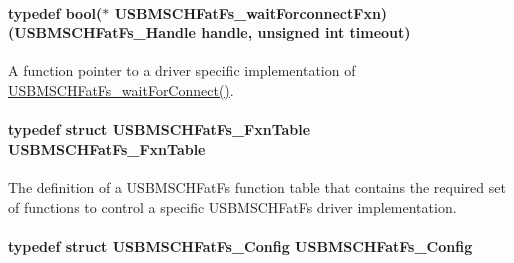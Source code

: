 \paragraph[{U\+S\+B\+M\+S\+C\+H\+Fat\+Fs\+\_\+wait\+Forconnect\+Fxn}]{\setlength{\rightskip}{0pt plus 5cm}typedef bool($\ast$ U\+S\+B\+M\+S\+C\+H\+Fat\+Fs\+\_\+wait\+Forconnect\+Fxn) ({\bf U\+S\+B\+M\+S\+C\+H\+Fat\+Fs\+\_\+\+Handle} handle, unsigned int timeout)}\label{_u_s_b_m_s_c_h_fat_fs_8h_a0c9baca220e5c94c5b5e27cb8963e6f8}


A function pointer to a driver specific implementation of \hyperlink{_u_s_b_m_s_c_h_fat_fs_8h_afc7ee4e1bbb95a37943335833a27f94c}{U\+S\+B\+M\+S\+C\+H\+Fat\+Fs\+\_\+wait\+For\+Connect()}. 

\paragraph[{U\+S\+B\+M\+S\+C\+H\+Fat\+Fs\+\_\+\+Fxn\+Table}]{\setlength{\rightskip}{0pt plus 5cm}typedef struct {\bf U\+S\+B\+M\+S\+C\+H\+Fat\+Fs\+\_\+\+Fxn\+Table}  {\bf U\+S\+B\+M\+S\+C\+H\+Fat\+Fs\+\_\+\+Fxn\+Table}}\label{_u_s_b_m_s_c_h_fat_fs_8h_a1d6f17f051fce0337c51c8c56d9b4675}


The definition of a U\+S\+B\+M\+S\+C\+H\+Fat\+Fs function table that contains the required set of functions to control a specific U\+S\+B\+M\+S\+C\+H\+Fat\+Fs driver implementation. 

\paragraph[{U\+S\+B\+M\+S\+C\+H\+Fat\+Fs\+\_\+\+Config}]{\setlength{\rightskip}{0pt plus 5cm}typedef struct {\bf U\+S\+B\+M\+S\+C\+H\+Fat\+Fs\+\_\+\+Config}  {\bf U\+S\+B\+M\+S\+C\+H\+Fat\+Fs\+\_\+\+Config}}\label{_u_s_b_m_s_c_h_fat_fs_8h_a880b0f12857d333b89a769963e0aad40}


